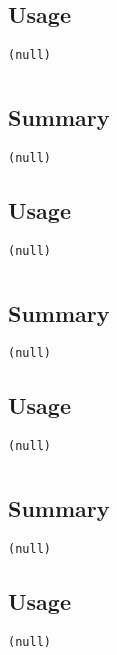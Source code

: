 \subsection{Usage}
\begin{verbatim}
(null)
\end{verbatim}


\section{}
\subsection{Summary}
\begin{verbatim}
(null)
\end{verbatim}
\subsection{Usage}
\begin{verbatim}
(null)
\end{verbatim}


\section{}
\subsection{Summary}
\begin{verbatim}
(null)
\end{verbatim}
\subsection{Usage}
\begin{verbatim}
(null)
\end{verbatim}


\section{}
\subsection{Summary}
\begin{verbatim}
(null)
\end{verbatim}
\subsection{Usage}
\begin{verbatim}
(null)
\end{verbatim}


